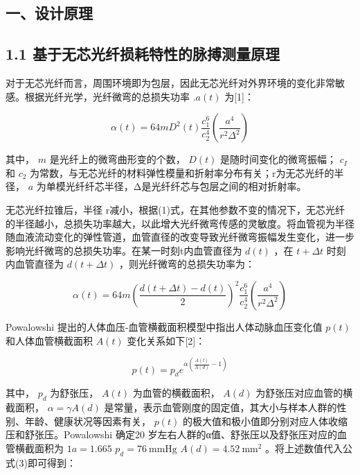 \documentclass[
  10
]{article}
\begin{document}
\subsection{一、设计原理}\label{ux4e00ux8bbeux8ba1ux539fux7406}

\subsection{1.1
基于无芯光纤损耗特性的脉搏测量原理}\label{ux57faux4e8eux65e0ux82afux5149ux7ea4ux635fux8017ux7279ux6027ux7684ux8109ux640fux6d4bux91cfux539fux7406}

对于无芯光纤而言，周围环境即为包层，因此无芯光纤对外界环境的变化非常敏感。根据光纤光学，光纤微弯的总损失功率
\(. a ( t )\) 为{[}1{]}：

\[
\alpha (t) = 6 4 m D ^ {2} (t) \frac {c _ {1} ^ {6}}{c _ {2} ^ {4}} \left(\frac {a ^ {4}}{r ^ {2} \Delta^ {2}}\right)\tag{1}
\]

其中， \(m\) 是光纤上的微弯曲形变的个数， \(D ( t )\)
是随时间变化的微弯振幅； \(c _ { I }\) 和 \(c _ { 2 }\)
为常数，与无芯光纤的材料弹性模量和折射率分布有关；r为无芯光纤的半径，
\(a\) 为单模光纤纤芯半径，Δ是光纤纤芯与包层之间的相对折射率。

无芯光纤拉锥后，半径
r减小，根据(1)式，在其他参数不变的情况下，无芯光纤的半径越小，总损失功率越大，以此增大光纤微弯传感的灵敏度。将血管视为半径随血液流动变化的弹性管道，血管直径的改变导致光纤微弯振幅发生变化，进一步影响光纤微弯的总损失功率。在某一时刻t内血管直径为
\(d ( t )\) ，在 \(t + \varDelta t\) 时刻内血管直径为
\(d ( t { + } \varDelta t )\) ，则光纤微弯的总损失功率为：

\[
\alpha (t) = 6 4 m \left(\frac {d (t + \Delta t) - d (t)}{2}\right) ^ {2} \frac {c _ {1} ^ {6}}{c _ {2} ^ {4}} \left(\frac {a ^ {4}}{r ^ {2} \Delta^ {2}}\right)\tag{2}
\]

Powalowshi 提出的人体血压-血管横截面积模型中指出人体动脉血压变化值
\(p ( t )\) 和人体血管横截面积 \(A ( t )\) 变化关系如下{[}2{]}：

\[
p (t) = p _ {d} e ^ {\alpha \left(\frac {A (t)}{A (d)} - 1\right)}\tag{3}
\]

其中， \(p _ { d }\) 为舒张压， \(A ( t )\) 为血管的横截面积，
\(A ( d )\) 为舒张压对应血管的横截面积， \(\alpha = \gamma A ( d )\)
是常量，表示血管刚度的固定值，其大小与样本人群的性别、年龄、健康状况等因素有关，
\(p ( t )\) 的极大值和极小值即分别对应人体收缩压和舒张压。Powalowshi
确定20 岁左右人群的α值、舒张压以及舒张压对应的血管横截面积为
\(\scriptstyle 1 a = 1 . 6 6 5\)
\(p _ { d } { = } 7 6 ~ \mathrm { m m H g }\)
\(\scriptstyle A ( d ) = 4 . 5 2 \ \mathrm { m m } ^ { 2 }\)
。将上述数值代入公式(3)即可得到：
\end{document}
